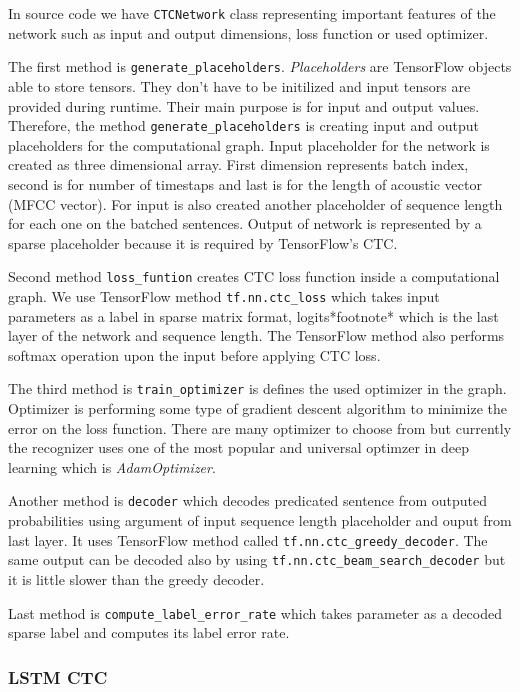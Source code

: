 In source code we have \texttt{CTCNetwork} class representing important features of the network such as input and output dimensions, loss function or used optimizer.

The first method is \texttt{generate\_placeholders}. \textit{Placeholders} are TensorFlow objects able to store tensors. They don't have to be initilized and input tensors are provided during runtime.
Their main purpose is for input and output values.
Therefore, the method \texttt{generate\_placeholders} is creating input and output placeholders for the computational graph.
Input placeholder for the network is created as three dimensional array. First dimension represents batch index, second is for number of timestaps and last is for the length of acoustic vector (MFCC vector).
For input is also created another placeholder of sequence length for each one on the batched sentences.
Output of network is represented by a sparse placeholder because it is required by TensorFlow's CTC.

Second method \texttt{loss\_funtion} creates CTC loss function inside a computational graph.
We use TensorFlow method \texttt{tf.nn.ctc\_loss} which takes input parameters as a label in sparse matrix format, logits*footnote* which is the last layer of the network and sequence length.
The TensorFlow method also performs softmax operation upon the input before applying CTC loss.

The third method is \texttt{train\_optimizer} is defines the used optimizer in the graph. Optimizer is performing some type of gradient descent algorithm to minimize the error on the loss function.
There are many optimizer to choose from but currently the recognizer uses one of the most popular and universal optimzer in deep learning which is \textit{AdamOptimizer}.

Another method is \texttt{decoder} which decodes predicated sentence from outputed probabilities using argument of input sequence length placeholder and ouput from last layer.
It uses TensorFlow method called \texttt{tf.nn.ctc\_greedy\_decoder}. The same output can be decoded also by using \texttt{tf.nn.ctc\_beam\_search\_decoder} but it is little slower than the greedy decoder.

Last method is \texttt{compute\_label\_error\_rate} which takes parameter as a decoded sparse label and computes its label error rate.

\subsubsection{LSTM CTC}

